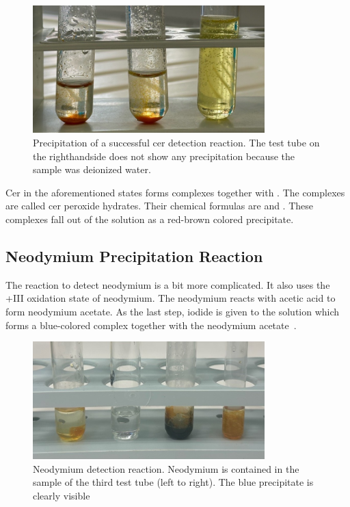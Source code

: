 \begin{figure}[H]
    \centering
    \includegraphics[width=0.8\textwidth]{./media/images/ree_precipitation_reaction_cropped}
    \caption{Precipitation of a successful cer detection reaction. The test tube on the righthandside does not show any precipitation because the sample was deionized water.}
    \label{fig:cer_precipitation_cropped1}
\end{figure}

Cer in the aforementioned states forms complexes together with .
The complexes are called cer peroxide hydrates.
Their chemical formulas are  and .
These complexes fall out of the solution as a red-brown colored precipitate.

\subsection{Neodymium Precipitation Reaction}
The reaction to detect neodymium is a bit more complicated.
It also uses the +III oxidation state of neodymium.
The neodymium reacts with acetic acid to form neodymium acetate.
As the last step, iodide is given to the solution which forms a blue-colored complex together with the neodymium acetate~\cite{janderblasius}.

\begin{figure}[H]
    \centering
    \includegraphics[width=0.8\textwidth]{./media/images/nd_precipitation_reaction_cropped}
    \caption{Neodymium detection reaction. Neodymium is contained in the sample of the third test tube (left to right). The blue precipitate is clearly visible}
    \label{fig:nd_precipitation}
\end{figure}

